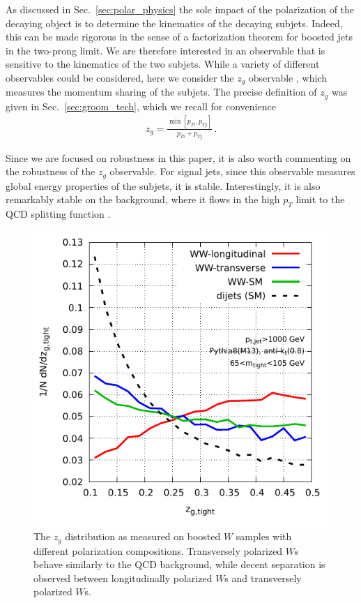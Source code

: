 \documentclass[11pt,letterpaper]{article}
\DeclareRobustCommand{\Sec}[1]{Sec.~\ref{#1}}
\begin{document}
As discussed in \Sec{sec:polar_physics} the sole impact of the polarization of the decaying object is to determine the kinematics of the decaying subjets. Indeed, this can be made rigorous in the sense of a factorization theorem for boosted jets in the two-prong limit. We are therefore interested in an observable that is sensitive to the kinematics of the two subjets. While a variety of different observables could be considered, here we consider the $z_g$ observable \cite{Larkoski:2014wba,Larkoski:2014bia,Larkoski:2015lea}, which measures the momentum sharing of the subjets. The precise definition of $z_g$ was given in \Sec{sec:groom_tech}, which we recall for convenience
\begin{align}
z_g=\frac{\min\left[ p_{Ti}, p_{Tj}  \right]}{p_{Ti}+p_{Tj}}\,.
\end{align}

Since we are focused on robustness in this paper, it is also worth commenting on the robustness of the $z_g$ observable. For signal jets, since this observable measures global energy properties of the subjets, it is stable. Interestingly, it is also remarkably stable on the background, where it flows in the high $p_T$ limit to the QCD splitting function \cite{Larkoski:2014wba,Larkoski:2014bia,Larkoski:2015lea}.



\begin{figure}
\begin{center}
\includegraphics[width=0.45\columnwidth]{figures/polarisation-zg-distrib}
\end{center}
\caption{The $z_g$ distribution as measured on boosted $W$ samples with different polarization compositions. Transversely polarized $W$s behave similarly to the QCD background, while decent separation is observed between longitudinally polarized $W$s and transversely polarized $W$s.}
\label{z_g_dist}
\end{figure}
\end{document}
